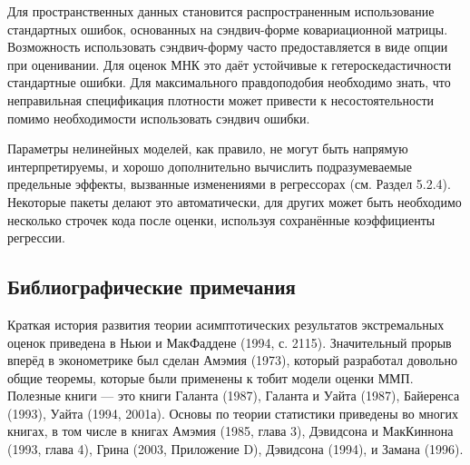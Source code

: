 Для пространственных данных становится распространенным использование стандартных ошибок, основанных на сэндвич-форме ковариационной матрицы. Возможность использовать сэндвич-форму часто предоставляется в виде опции при оценивании. Для оценок МНК это даёт устойчивые к гетероскедастичности стандартные ошибки. Для максимального правдоподобия необходимо знать, что неправильная спецификация плотности может привести к несостоятельности помимо  необходимости использовать сэндвич ошибки.

Параметры нелинейных моделей, как правило, не могут быть напрямую интерпретируемы, и хорошо дополнительно вычислить подразумеваемые предельные эффекты, вызванные изменениями в регрессорах (см. Раздел 5.2.4). Некоторые пакеты делают это автоматически, для других может быть необходимо несколько строчек кода после оценки, используя сохранённые коэффициенты регрессии.

\subsection{Библиографические примечания}

Краткая история развития теории асимптотических результатов экстремальных оценок приведена в Ньюи и МакФаддене (1994, с. 2115). Значительный прорыв вперёд в эконометрике был сделан Амэмия (1973), который разработал довольно общие теоремы, которые были применены к тобит модели оценки ММП. Полезные книги --- это книги Галанта (1987), Галанта и Уайта (1987), Байеренса (1993), Уайта (1994, 2001а). Основы по теории статистики приведены во многих книгах, в том числе в книгах Амэмия (1985, глава 3), Дэвидсона и МакКиннона (1993, глава 4), Грина (2003, Приложение D), Дэвидсона (1994), и Замана (1996).

